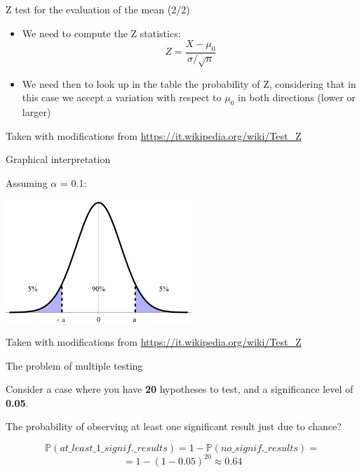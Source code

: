 \documentclass{beamer}
\begin{document}
\begin{frame}
{\centerline{Z test for the evaluation of the mean (2/2)}}

\begin{itemize}
\item We need to compute the Z statistics:
\[ Z={\frac {X-\mu _{0}}{\sigma /{\sqrt {n}}}} \]
\item We need then to look up in the table the probability of Z, considering that in this case we accept a variation with respect to $\mu_0$ in both directions (lower or larger)
\end{itemize}


\begin{center}
\tiny{Taken with modifications from \url{https://it.wikipedia.org/wiki/Test_Z}}
\end{center}

\end{frame}

\begin{frame}
{\centerline{Graphical interpretation}}

Assuming $\alpha$ = 0.1:

\begin{center}
\includegraphics[width=70mm]{P2023.AIBCCSS.InferenceAndLogisticRegression/Confidence_Interval_90P.png}
\end{center}

\begin{center}
\tiny{Taken with modifications from \url{https://it.wikipedia.org/wiki/Test_Z}}
\end{center}

\end{frame}




\begin{frame}
{\centerline{The problem of multiple testing }}
Consider a case where you have \textbf{20} hypotheses to test, and a significance level of \textbf{0.05}. 
\newline

The probability of observing at least one significant result just due to chance?

$$\mathbb{P}(at\_least\_1\_signif.\_results) = 1 - \mathbb{P}(no\_signif.\_results) = $$
$$= 1 - (1-0.05)^{20} \approx 0.64$$


\end{frame}
\end{document}
